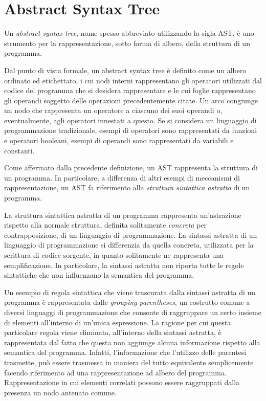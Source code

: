 \section{Abstract Syntax Tree}
\label{abstract-syntax-tree}

Un \textit{abstract syntax tree}, nome spesso abbreviato utilizzando la sigla
AST, è uno strumento per la rappresentazione, sotto forma di albero, della
struttura di un programma.

Dal punto di vista formale, un abstract syntax tree è definito come un albero
ordinato ed etichettato, i cui nodi interni rappresentano gli operatori
utilizzati dal codice del programma che si desidera rappresentare e le cui
foglie rappresentano gli operandi soggetto delle operazioni precedentemente
citate. Un arco congiunge un nodo che rappresenta un operatore a ciascuno dei
suoi operandi o, eventualmente, agli operatori innestati a questo. Se si
considera un linguaggio di programmazione tradizionale, esempi di operatori sono
rappresentati da funzioni e operatori booleani, esempi di operandi sono
rappresentati da variabili e constanti.

Come affermato dalla precedente definizione, un AST rappresenta la struttura di
un programma. In particolare, a differenza di altri esempi di meccanismi di
rappresentazione, un AST fa riferimento alla \textit{struttura sintattica
astratta} di un programma.

La struttura sintattica astratta di un programma rappresenta un’astrazione
rispetto alla normale struttura, definita solitamente \textit{concreta} per
contrapposizione, di un linguaggio di programmazione. La sintassi astratta di un
linguaggio di programmazione si differenzia da quella concreta, utilizzata per
la scrittura di codice sorgente, in quanto solitamente ne rappresenta una
semplificazione. In particolare, la sintassi astratta non riporta tutte le
regole sintattiche che non influenzano la semantica del programma.

Un esempio di regola sintattica che viene trascurata dalla sintassi astratta di
un programma è rappresentata dalle \textit{grouping parentheses}, un costrutto
comune a diversi linguaggi di programmazione che consente di raggruppare un
certo insieme di elementi all'interno di un'unica espressione. La ragione per
cui questa particolare regola viene eliminata, all’interno della sintassi
astratta, è rappresentata dal fatto che questa non aggiunge alcuna informazione
rispetto alla semantica del programma. Infatti, l’informazione che l’utilizzo
delle parentesi trasmette, può essere trasmessa in maniera del tutto equivalente
semplicemente facendo riferimento ad una rappresentazione ad albero del
programma. Rappresentazione in cui elementi correlati possono essere raggruppati
dalla presenza un nodo antenato comune.

